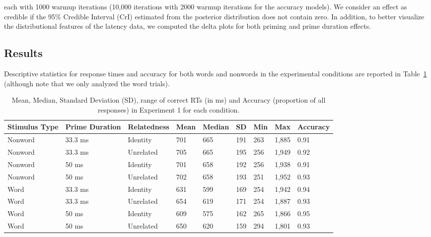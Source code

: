 \documentclass[
  english,
  man,floatsintext]{apa6}
\begin{document}
each with 1000 warmup iterations (10,000 iterations with 2000 warmup iterations for the accuracy models). We consider an effect as credible if the 95\% Credible Interval (CrI) estimated from the posterior distribution does not contain zero.
In addition, to better visualize the distributional features of the latency data, we computed the delta plots for both priming and prime duration effects.

\hypertarget{results}{%
\subsection{Results}\label{results}}

Descriptive statistics for response times and accuracy for both words and nonwords in the experimental conditions are reported in Table~\ref{tab:exp1-descriptive-rt-table} (although note that we only analyzed the word trials).



\begin{table}[tbp]

\begin{center}
\begin{threeparttable}

\caption{\label{tab:exp1-descriptive-rt-table}Mean, Median, Standard Deviation (SD), range of correct RTs (in ms) and Accuracy (proportion of all responses) in Experiment 1 for each condition.}

\begin{tabular}{lllllllll}
\toprule
Stimulus Type & \multicolumn{1}{c}{Prime Duration} & \multicolumn{1}{c}{Relatedness} & \multicolumn{1}{c}{Mean} & \multicolumn{1}{c}{Median} & \multicolumn{1}{c}{SD} & \multicolumn{1}{c}{Min} & \multicolumn{1}{c}{Max} & \multicolumn{1}{c}{Accuracy}\\
\midrule
Nonword & 33.3 ms & Identity & 701 & 665 & 191 & 263 & 1,885 & 0.91\\
Nonword & 33.3 ms & Unrelated & 705 & 665 & 195 & 256 & 1,949 & 0.92\\
Nonword & 50 ms & Identity & 701 & 658 & 192 & 256 & 1,938 & 0.91\\
Nonword & 50 ms & Unrelated & 702 & 658 & 193 & 251 & 1,952 & 0.93\\
Word & 33.3 ms & Identity & 631 & 599 & 169 & 254 & 1,942 & 0.94\\
Word & 33.3 ms & Unrelated & 654 & 619 & 171 & 254 & 1,887 & 0.93\\
Word & 50 ms & Identity & 609 & 575 & 162 & 265 & 1,866 & 0.95\\
Word & 50 ms & Unrelated & 650 & 620 & 159 & 294 & 1,801 & 0.93\\
\bottomrule
\end{tabular}

\end{threeparttable}
\end{center}

\end{table}
\end{document}
